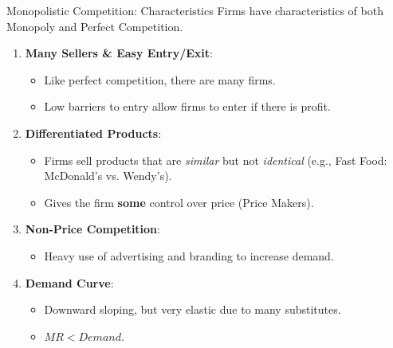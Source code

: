 \documentclass[aspectratio=169]{beamer}
\begin{document}
\begin{frame}{Monopolistic Competition: Characteristics}
    Firms have characteristics of both Monopoly and Perfect Competition.
    \vspace{0.3cm}
    \begin{enumerate}
        \item<1-> \textbf{Many Sellers \& Easy Entry/Exit}: 
        \begin{itemize}
            \item Like perfect competition, there are many firms.
            \item Low barriers to entry allow firms to enter if there is profit.
        \end{itemize}
        \item<2-> \textbf{Differentiated Products}:
        \begin{itemize}
            \item Firms sell products that are \textit{similar} but not \textit{identical} (e.g., Fast Food: McDonald's vs. Wendy's).
            \item Gives the firm \textbf{some} control over price (Price Makers).
        \end{itemize}
        \item<3-> \textbf{Non-Price Competition}:
        \begin{itemize}
            \item Heavy use of advertising and branding to increase demand.
        \end{itemize}
        \item<4-> \textbf{Demand Curve}:
        \begin{itemize}
            \item Downward sloping, but very elastic due to many substitutes.
            \item $MR < Demand$.
        \end{itemize}
    \end{enumerate}
\end{frame}
\end{document}
